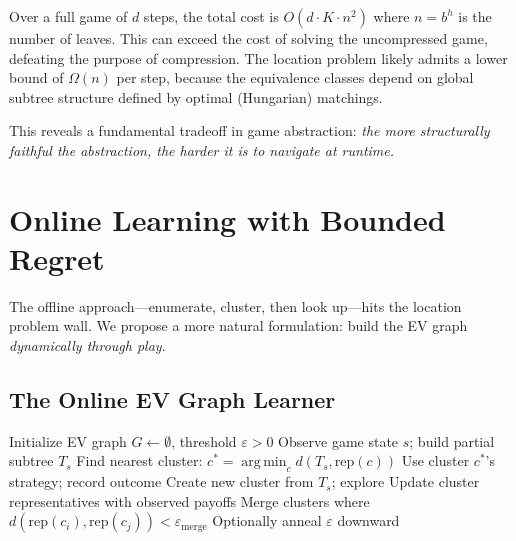 \documentclass[11pt]{article}
\newcommand{\rep}{\mathrm{rep}}
\DeclareMathOperator*{\argmin}{arg\,min}
\begin{document}
Over a full game of $d$ steps, the total cost is $O(d \cdot K \cdot
n^2)$ where $n = b^h$ is the number of leaves. This can exceed the cost
of solving the uncompressed game, defeating the purpose of compression.
The location problem likely admits a lower bound of $\Omega(n)$ per
step, because the equivalence classes depend on global subtree
structure defined by optimal (Hungarian) matchings.

This reveals a fundamental tradeoff in game abstraction: \emph{the more
structurally faithful the abstraction, the harder it is to navigate at
runtime.}

\section{Online Learning with Bounded Regret}
\label{sec:online}

The offline approach---enumerate, cluster, then look up---hits the
location problem wall. We propose a more natural formulation: build the
EV graph \emph{dynamically through play}.

\subsection{The Online EV Graph Learner}

\begin{algorithm}[t]
\caption{Online EV Graph Construction via Self-Play}
\label{alg:online}
\begin{algorithmic}[1]
\STATE Initialize EV graph $G \leftarrow \emptyset$, threshold
  $\varepsilon > 0$
    \STATE Observe game state $s$; build partial subtree $T_s$
    \STATE Find nearest cluster: $c^* = \argmin_c d(T_s, \rep(c))$
    \IF{$d(T_s, \rep(c^*)) \le \varepsilon$ \textbf{(cache hit)}}
      \STATE Use cluster $c^*$'s strategy; record outcome
      \STATE Create new cluster from $T_s$; explore
    \ENDIF
  \ENDFOR
  \STATE Update cluster representatives with observed payoffs
  \STATE Merge clusters where $d(\rep(c_i), \rep(c_j)) <
    \varepsilon_{\mathrm{merge}}$
  \STATE Optionally anneal $\varepsilon$ downward
\ENDFOR
\end{algorithmic}
\end{algorithm}
\end{document}

